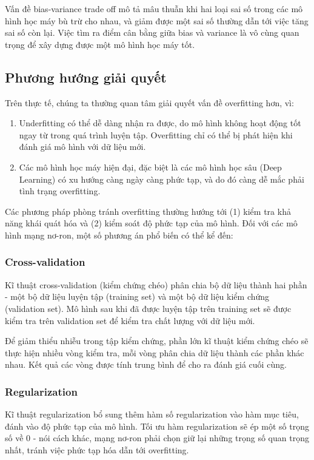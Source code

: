 \documentclass[12pt]{extreport}
\begin{document}
Vấn đề bias-variance trade off mô tả mâu thuẫn khi hai loại sai số trong các mô hình học máy bù trừ cho nhau, và giảm được một sai số thường dẫn tới việc tăng sai số còn lại. Việc tìm ra điểm cân bằng giữa bias và variance là vô cùng quan trọng để xây dựng được một mô hình học máy tốt.

\subsection{Phương hướng giải quyết}

Trên thực tế, chúng ta thường quan tâm giải quyết vấn đề overfitting hơn, vì:
\begin{enumerate}
    \item Underfitting có thể dễ dàng nhận ra được, do mô hình không hoạt động tốt ngay từ trong quá trình luyện tập. Overfitting chỉ có thể bị phát hiện khi đánh giá mô hình với dữ liệu mới.
    \item Các mô hình học máy hiện đại, đặc biệt là các mô hình học sâu (Deep Learning) có xu hướng càng ngày càng phức tạp, và do đó càng dễ mắc phải tình trạng overfitting.
\end{enumerate}

Các phương pháp phòng tránh overfitting thường hướng tới (1) kiểm tra khả năng khái quát hóa và (2) kiểm soát độ phức tạp của mô hình. Đối với các mô hình mạng nơ-ron, một số phương án phổ biến có thể kể đến:

\subsubsection{Cross-validation}

Kĩ thuật cross-validation (kiểm chứng chéo) phân chia bộ dữ liệu thành hai phần - một bộ dữ liệu luyện tập (training set) và một bộ dữ liệu kiểm chứng (validation set). Mô hình sau khi đã được luyện tập trên training set sẽ được kiểm tra trên validation set để kiểm tra chất lượng với dữ liệu mới.

Để giảm thiểu nhiễu trong tập kiểm chứng, phần lớn kĩ thuật kiểm chứng chéo sẽ thực hiện nhiều vòng kiểm tra, mỗi vòng phân chia dữ liệu thành các phần khác nhau. Kết quả các vòng được tính trung bình để cho ra đánh giá cuối cùng.

\subsubsection{Regularization}

Kĩ thuật regularization bổ sung thêm hàm số regularization vào hàm mục tiêu, đánh vào độ phức tạp của mô hình. Tối ưu hàm regularization sẽ ép một số trọng số về 0 - nói cách khác, mạng nơ-ron phải chọn giữ lại những trọng số quan trọng nhất, tránh việc phức tạp hóa dẫn tới overfitting.
\end{document}
